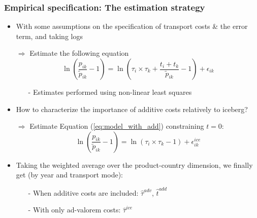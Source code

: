 \documentclass[10 pt,Helvetica, french]{beamer}
\begin{document}
\begin{frame}  [label=slide_method]
\frametitle{Empirical specification: The estimation strategy }
\begin{itemize}
\item With some assumptions on the specification of transport costs \& the error term, and taking logs  \hyperlink{app_method_1}{}\vspace{0.1cm}
\item[$\Rightarrow$] Estimate the following equation \vspace{0.1cm}
\footnotesize
\begin{equation}
\ln\left(\frac{p_{ik}}{\widetilde{p}_{ik}}-1 \right)= \ln \left(\tau_{i} \times \tau_{k}+\frac{t_{i} + t_{k}}{\widetilde{p}_{ik}}-1 \right) + \epsilon_{ik} \label{eq:model_with_add}
\end{equation}
\begin{itemize}
\item[-] Estimates performed using non-linear least squares \hyperlink{app_method_2}{} \vspace{0.1cm}
\end{itemize}
\normalsize
\item How to characterize the importance of additive costs relatively to iceberg? \vspace{0.1cm}
\item[$\Rightarrow$] Estimate Equation (\ref{eq:model_with_add}) constraining $t=0$:
\footnotesize
\begin{equation}
\ln\left(\frac{p_{ik}}{\widetilde{p}_{ik}}-1 \right)= \ln \left(\tau_{i} \times \tau_{k}-1 \right) + \epsilon^{ice}_{ik} \label{eq:model_nlI}
\end{equation}
\normalsize
\item  Taking the weighted average over the product-country dimension, we finally get (by year and transport mode): \hyperlink{app_method_2}{}\vspace{0.1cm}
\begin{itemize}
\item[-] When additive costs are included: $\widehat{\tau}^{adv}$, $\widehat{t}^{add}$  \vspace{0.1cm}
\item[-] With only ad-valorem costs: $\widehat{\tau}^{ice}$
\end{itemize}
\end{itemize}
\end{frame}
\end{document}
